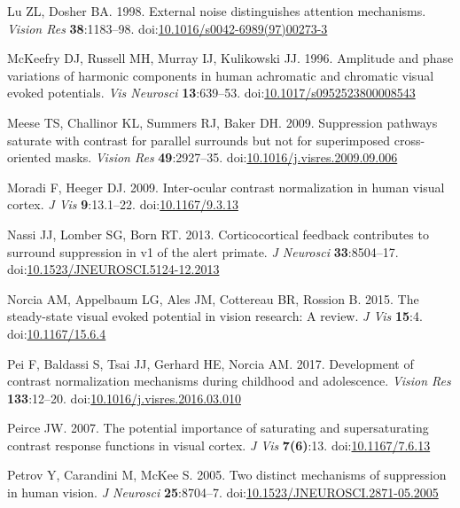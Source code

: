 \documentclass[]{article}
\begin{document}
\leavevmode\hypertarget{ref-Lu1998}{}%
Lu ZL, Dosher BA. 1998. External noise distinguishes attention mechanisms. \emph{Vision Res} \textbf{38}:1183--98. doi:\href{https://doi.org/10.1016/s0042-6989(97)00273-3}{10.1016/s0042-6989(97)00273-3}

\leavevmode\hypertarget{ref-McKeefry1996}{}%
McKeefry DJ, Russell MH, Murray IJ, Kulikowski JJ. 1996. Amplitude and phase variations of harmonic components in human achromatic and chromatic visual evoked potentials. \emph{Vis Neurosci} \textbf{13}:639--53. doi:\href{https://doi.org/10.1017/s0952523800008543}{10.1017/s0952523800008543}

\leavevmode\hypertarget{ref-Meese2009}{}%
Meese TS, Challinor KL, Summers RJ, Baker DH. 2009. Suppression pathways saturate with contrast for parallel surrounds but not for superimposed cross-oriented masks. \emph{Vision Res} \textbf{49}:2927--35. doi:\href{https://doi.org/10.1016/j.visres.2009.09.006}{10.1016/j.visres.2009.09.006}

\leavevmode\hypertarget{ref-Moradi2009}{}%
Moradi F, Heeger DJ. 2009. Inter-ocular contrast normalization in human visual cortex. \emph{J Vis} \textbf{9}:13.1--22. doi:\href{https://doi.org/10.1167/9.3.13}{10.1167/9.3.13}

\leavevmode\hypertarget{ref-Nassi2013}{}%
Nassi JJ, Lomber SG, Born RT. 2013. Corticocortical feedback contributes to surround suppression in v1 of the alert primate. \emph{J Neurosci} \textbf{33}:8504--17. doi:\href{https://doi.org/10.1523/JNEUROSCI.5124-12.2013}{10.1523/JNEUROSCI.5124-12.2013}

\leavevmode\hypertarget{ref-Norcia2015}{}%
Norcia AM, Appelbaum LG, Ales JM, Cottereau BR, Rossion B. 2015. The steady-state visual evoked potential in vision research: A review. \emph{J Vis} \textbf{15}:4. doi:\href{https://doi.org/10.1167/15.6.4}{10.1167/15.6.4}

\leavevmode\hypertarget{ref-Pei2017}{}%
Pei F, Baldassi S, Tsai JJ, Gerhard HE, Norcia AM. 2017. Development of contrast normalization mechanisms during childhood and adolescence. \emph{Vision Res} \textbf{133}:12--20. doi:\href{https://doi.org/10.1016/j.visres.2016.03.010}{10.1016/j.visres.2016.03.010}

\leavevmode\hypertarget{ref-Peirce2007}{}%
Peirce JW. 2007. The potential importance of saturating and supersaturating contrast response functions in visual cortex. \emph{J Vis} \textbf{7(6)}:13. doi:\href{https://doi.org/10.1167/7.6.13}{10.1167/7.6.13}

\leavevmode\hypertarget{ref-Petrov2005}{}%
Petrov Y, Carandini M, McKee S. 2005. Two distinct mechanisms of suppression in human vision. \emph{J Neurosci} \textbf{25}:8704--7. doi:\href{https://doi.org/10.1523/JNEUROSCI.2871-05.2005}{10.1523/JNEUROSCI.2871-05.2005}
\end{document}
